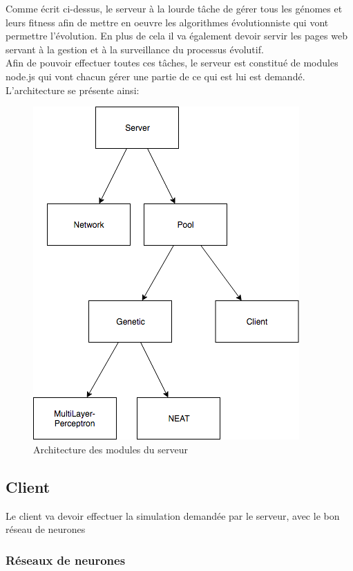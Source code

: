 \documentclass{article}
\begin{document}
Comme écrit ci-dessus, le serveur à la lourde tâche de gérer tous les génomes et leurs fitness afin de mettre en oeuvre les algorithmes évolutionniste qui vont permettre l'évolution. En plus de cela il va également devoir servir les pages web servant à la gestion et à la surveillance du processus évolutif.\\
Afin de pouvoir effectuer toutes ces tâches, le serveur est constitué de modules node.js qui vont chacun gérer une partie de ce qui est lui est demandé.\\
L'architecture se présente ainsi:
\begin{figure}[h]
\begin{center}
	\includegraphics[scale=0.5]{"server.png"} 
	\caption{Architecture des modules du serveur}
\end{center}
\end{figure}
\newpage

\subsection{Client}

Le client va devoir effectuer la simulation demandée par le serveur, avec le bon réseau de neurones

\subsubsection{Réseaux de neurones}
\end{document}
